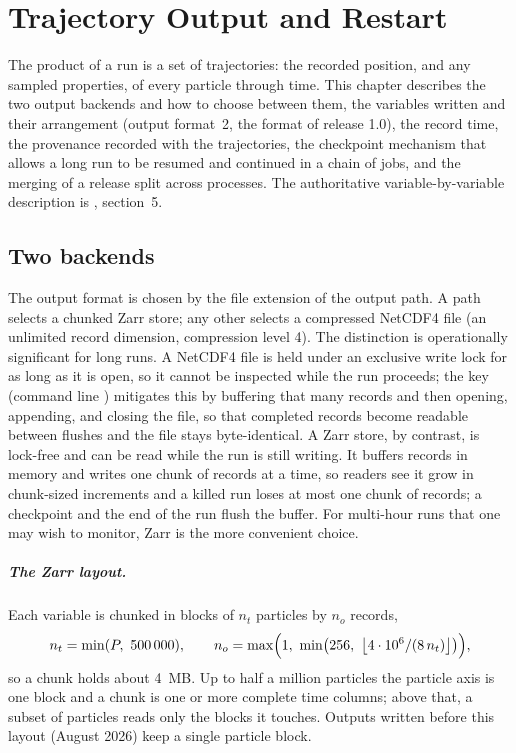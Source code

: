 \chapter{Trajectory Output and Restart}\label{ch:output}

The product of a run is a set of trajectories: the recorded position, and any sampled properties, of every
particle through time. This chapter describes the two output backends and how to choose between them, the
variables written and their arrangement (output format~2, the format of release 1.0), the record time, the
provenance recorded with the trajectories, the checkpoint mechanism that allows a long run to be resumed and
continued in a chain of jobs, and the merging of a release split across processes. The authoritative
variable-by-variable description is , section~5.

\section{Two backends}\label{sec:out-backends}

The output format is chosen by the file extension of the output path. A  path selects a chunked
Zarr store; any other selects a compressed NetCDF4 file (an unlimited record dimension, compression level 4).
The distinction is operationally significant for long runs. A NetCDF4 file is held under an exclusive write
lock for as long as it is open, so it cannot be inspected while the run proceeds; the key
 (command line ) mitigates this by buffering that many records
and then opening, appending, and closing the file, so that completed records become readable between flushes
and the file stays byte-identical. A Zarr store, by contrast, is lock-free and can be read while the run is
still writing. It buffers records in memory and writes one chunk of records at a time, so readers see it grow
in chunk-sized increments and a killed run loses at most one chunk of records; a checkpoint and the end of the
run flush the buffer. For multi-hour runs that one may wish to monitor, Zarr is the more convenient choice.

\paragraph{The Zarr layout.} Each variable is chunked in blocks of $n_t$ particles by $n_o$ records,
\begin{equation}\label{eq:out-chunks}
  n_t=\min(P,\ \num{500000}),\qquad
  n_o=\max\Bigl(1,\ \min\bigl(256,\ \bigl\lfloor 4\cdot10^{6}/(8\,n_t)\bigr\rfloor\bigr)\Bigr),
\end{equation}
so a chunk holds about \SI{4}{MB}. Up to half a million particles the particle axis is one block and a chunk
is one or more complete time columns; above that, a subset of particles reads only the blocks it touches.
Outputs written before this layout (August 2026) keep a single particle block.

